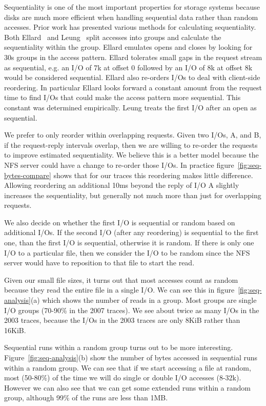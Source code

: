 Sequentiality is one of the most important properties for storage
systems because disks are much more efficient when handling sequential
data rather than random accesses.  Prior work has presented
various methods for calculating sequentiality.  Both
Ellard~\cite{EllardFast03} and Leung~\cite{LeungUsenix08} split accesses
into groups and calculate the sequentiality within the group.  Ellard
emulates opens and closes by looking for 30s groups in the access
pattern.  Ellard tolerates small gaps in the request stream as
sequential, e.g. an I/O of 7k at offset 0 followed by an I/O of 8k at
offset 8k would be considered sequential.  Ellard also re-orders I/Os
to deal with client-side reordering. In particular Ellard looks
forward a constant amount from the request time to find I/Os that
could make the access pattern more sequential.  This constant was
determined empirically.  Leung treats the first I/O after an open as
sequential.

We prefer to only reorder within overlapping requests. Given two I/Os,
A, and B, if the request-reply intervals overlap, then we are willing
to re-order the requests to improve estimated sequentiality.  We
believe this is a better model because the NFS server could have a
change to re-order those I/Os.  In practice
figure~\ref{fig:seq-bytes-compare} shows that for our traces this
reordering makes little difference.  Allowing reordering an additional
10ms beyond the reply of I/O A slightly increases the sequentiality,
but generally not much more than just for overlapping requests.

We also decide on whether the first I/O is sequential or random based
on additional I/Os.  If the second I/O (after any reordering) is
sequential to the first one, than the first I/O is sequential,
otherwise it is random.  If there is only one I/O to a particular
file, then we consider the I/O to be random since the NFS server would
have to reposition to that file to start the read.  

Given our small file sizes, it turns out that most accesses count as
random because they read the entire file in a single I/O.  We can see
this in figure~\ref{fig:seq-analysis}(a) which shows the number of
reads in a group.  Most groups are single I/O groups (70-90\% in the
2007 traces).  We see about twice as many I/Os in the 2003 traces,
because the I/Os in the 2003 traces are only 8KiB rather than 16KiB.

Sequential runs within a random group turns out to be more
interesting.  Figure~\ref{fig:seq-analysis}(b) show the number of
bytes accessed in sequential runs within a
random group.  We can see that if we start accessing a file at random,
most (50-80\%) of the time we will do single or double I/O accesses (8-32k).
However we can also see that we can get some extended runs within a
random group, although 99\% of the runs are less than 1MB.

